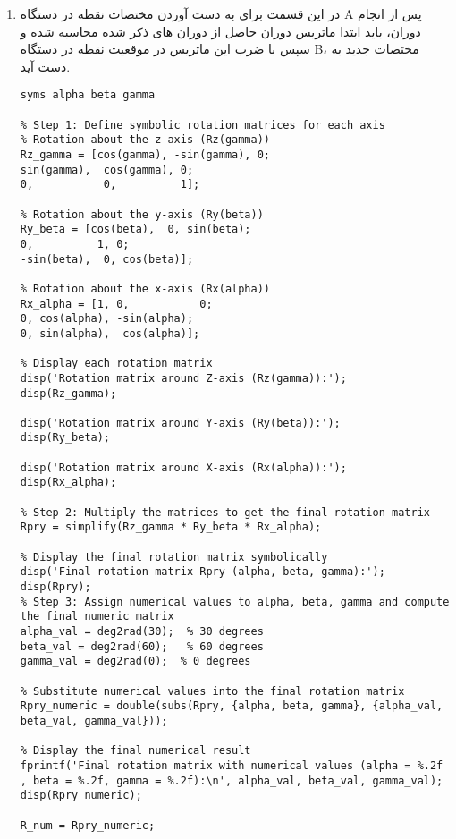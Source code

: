 \begin{enumerate}
	\item 
در این قسمت برای به دست آوردن مختصات نقطه در دستگاه A پس از انجام دوران، باید ابتدا ماتریس دوران حاصل از دوران های ذکر شده محاسبه شده و سپس با ضرب این ماتریس در موقعیت نقطه در دستگاه B، مختصات جدید به دست آید. 

\begin{latin}
	\begin{lstlisting}[frame=single,style=Matlab-Pyglike]
% Define symbolic angles alpha, beta, and gamma
syms alpha beta gamma

% Step 1: Define symbolic rotation matrices for each axis
% Rotation about the z-axis (Rz(gamma))
Rz_gamma = [cos(gamma), -sin(gamma), 0;
sin(gamma),  cos(gamma), 0;
0,           0,          1];

% Rotation about the y-axis (Ry(beta))
Ry_beta = [cos(beta),  0, sin(beta);
0,          1, 0;
-sin(beta),  0, cos(beta)];

% Rotation about the x-axis (Rx(alpha))
Rx_alpha = [1, 0,           0;
0, cos(alpha), -sin(alpha);
0, sin(alpha),  cos(alpha)];

% Display each rotation matrix
disp('Rotation matrix around Z-axis (Rz(gamma)):');
disp(Rz_gamma);

disp('Rotation matrix around Y-axis (Ry(beta)):');
disp(Ry_beta);

disp('Rotation matrix around X-axis (Rx(alpha)):');
disp(Rx_alpha);

% Step 2: Multiply the matrices to get the final rotation matrix
Rpry = simplify(Rz_gamma * Ry_beta * Rx_alpha);

% Display the final rotation matrix symbolically
disp('Final rotation matrix Rpry (alpha, beta, gamma):');
disp(Rpry);
% Step 3: Assign numerical values to alpha, beta, gamma and compute the final numeric matrix
alpha_val = deg2rad(30);  % 30 degrees
beta_val = deg2rad(60);   % 60 degrees
gamma_val = deg2rad(0);  % 0 degrees

% Substitute numerical values into the final rotation matrix
Rpry_numeric = double(subs(Rpry, {alpha, beta, gamma}, {alpha_val, beta_val, gamma_val}));

% Display the final numerical result
fprintf('Final rotation matrix with numerical values (alpha = %.2f , beta = %.2f, gamma = %.2f):\n', alpha_val, beta_val, gamma_val);
disp(Rpry_numeric);

R_num = Rpry_numeric;
		
	\end{lstlisting}
\end{latin}


\end{enumerate}
